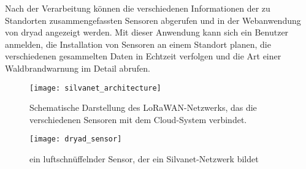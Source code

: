 Nach der Verarbeitung können die verschiedenen Informationen der zu Standorten zusammengefassten Sensoren abgerufen und in der Webanwendung von dryad angezeigt werden.
Mit dieser Anwendung kann sich ein Benutzer anmelden, die Installation von Sensoren an einem Standort planen, die verschiedenen gesammelten Daten in Echtzeit verfolgen und die Art einer Waldbrandwarnung im Detail abrufen.

\begin{figure}[h]
  \centering
  \texttt{[image: silvanet\_architecture]}
  \caption{Schematische Darstellung des LoRaWAN-Netzwerks, das die verschiedenen Sensoren mit dem Cloud-System verbindet.}
\end{figure}


\begin{figure}[h]
  \centering
  \texttt{[image: dryad\_sensor]}
  \caption{ein luftschnüffelnder Sensor, der ein Silvanet-Netzwerk bildet}
\end{figure}
